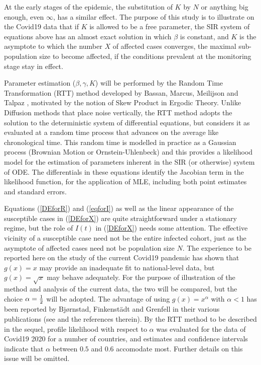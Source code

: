 \documentclass{article}
\begin{document}
At the early stages of the epidemic, the substitution of $K$ by $N$ or anything big enough, even $\infty$, has a similar effect. The purpose of this study is to illustrate on the Covid19 data that if $K$ is allowed to be a free parameter, the SIR system of equations above has an almost exact solution in which $\beta$ is constant, and $K$ is the asymptote to which the number $X$ of affected cases converges, the maximal sub-population size to become affected, if the conditions prevalent at the monitoring stage stay in effect.

Parameter estimation ($\beta, \gamma, K$) will be performed by the Random Time Transformation (RTT) method developed by Bassan, Marcus, Meilijson and Talpaz \cite{Bassanetal}, motivated by the notion of Skew Product in Ergodic Theory. Unlike Diffusion methods that place noise vertically, the RTT method adopts the solution to the deterministic system of differential equations, but considers it as evaluated at a random time process that advances on the average like chronological time. This random time is modelled in practice as a Gaussian process (Brownian Motion or Ornstein-Uhlenbeck) and this provides a likelihood model for the estimation of parameters inherent in the SIR (or otherwise) system of ODE. The differentials in these equations identify the Jacobian term in the likelihood function, for the application of MLE, including both point estimates and standard errors.

\bigskip

Equations (\ref{DEforR}) and (\ref{eqforI}) as well as the linear appearance of the susceptible cases in (\ref{DEforX}) are quite straightforward under a stationary regime, but the role of $I(t)$ in (\ref{DEforX}) needs some attention. The effective vicinity of a susceptible case need not be the entire infected cohort, just as the asymptote of affected cases need not be population size $N$. The experience to be reported here on the study of the current Covid19 pandemic has shown that $g(x)=x$ may provide an inadequate fit to national-level data, but $g(x)=\sqrt{x}$ may behave adequately. For the purpose of illustration of the method and analysis of the current data, the two will be compared, but the choice $\alpha={1 \over 2}$ will be adopted. The advantage of using $g(x)=x^\alpha$ with $\alpha<1$ has been reported by Bj{\o}rnstad, Finkenst\"{a}dt and Grenfell in their various publications (see \cite{AAA} and the references therein). By the RTT method to be described in the sequel, profile likelihood with respect to $\alpha$ was evaluated for the data of Covid19 2020 for a number of countries, and estimates and confidence intervals indicate that $\alpha$ between $0.5$ and $0.6$ accomodate most. Further details on this issue will be omitted.
\end{document}
